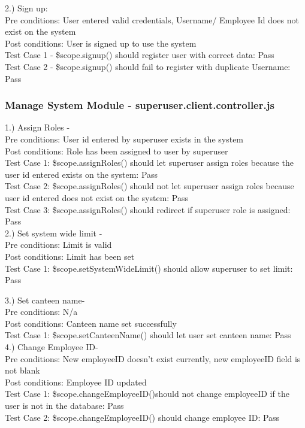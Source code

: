 \documentclass[a4paper,12pt]{report}
\begin{document}
2.) Sign up: \\
Pre conditions: User entered valid credentials, Username/ Employee Id does not exist on the system
\\ Post conditions: User is signed up to use the system \\
Test Case 1 - \$scope.signup()  should register user with correct data: Pass \\
Test Case 2 - \$scope.signup()  should fail to register with duplicate Username: Pass

\subsubsection{Manage System Module - superuser.client.controller.js }
1.) Assign Roles - \\
Pre conditions: User id entered by superuser exists in the system \\
Post conditions: Role has been assigned to user by superuser \\
Test Case 1: \$scope.assignRoles() should let superuser assign roles because the user id entered exists on the system: Pass
\\ Test Case 2:  \$scope.assignRoles() should not let superuser assign roles because user id entered does not exist on the system: Pass \\
Test Case 3: \$scope.assignRoles() should redirect if superuser role is assigned: Pass \\
 
2.) Set system wide limit - \\
Pre conditions: Limit is valid \\
Post conditions: Limit has been set \\
Test Case 1: \$scope.setSystemWideLimit() should allow superuser to set limit: Pass

3.) Set canteen name-\\
Pre conditions: N/a \\
Post conditions: Canteen name set successfully \\
Test Case 1: \$scope.setCanteenName()  should let user set canteen name: Pass \\

4.) Change Employee ID- \\
Pre conditions: New employeeID doesn't exist currently, new employeeID field is not blank \\
Post conditions: Employee ID updated \\
Test Case 1: \$scope.changeEmployeeID()should not change employeeID if the user is not in the database: Pass \\
Test Case 2: \$scope.changeEmployeeID() should change employee ID: Pass \\
\end{document}
